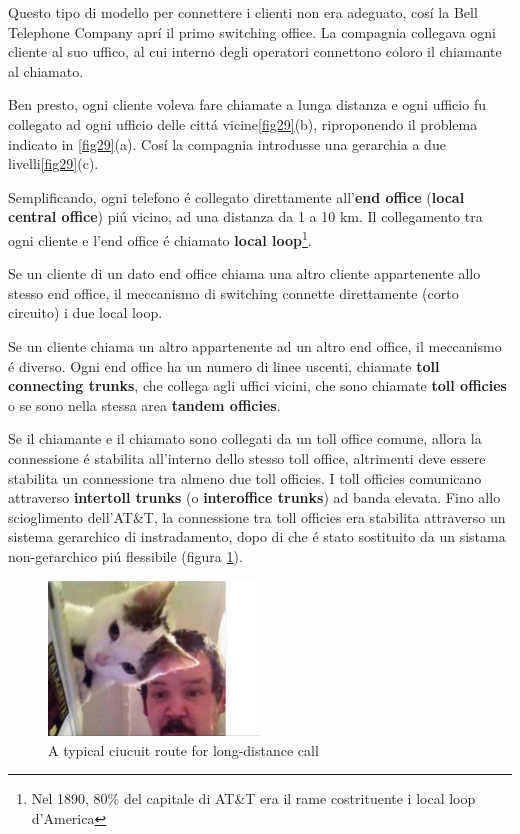 \documentclass[../ComputerNetworks.tex]{subfiles}
\begin{document}
Questo tipo di modello per connettere i clienti non era adeguato, cosí la Bell Telephone Company aprí il primo switching office.
La compagnia collegava ogni cliente al suo uffico, al cui interno degli operatori connettono coloro il chiamante al chiamato.

Ben presto, ogni cliente voleva fare chiamate a lunga distanza e ogni ufficio fu collegato ad ogni ufficio delle cittá vicine\ref{fig29}(b), riproponendo il problema indicato in \ref{fig29}(a).
Cosí la compagnia introdusse una gerarchia a due livelli\ref{fig29}(c).

Semplificando, ogni telefono é collegato direttamente all’\textbf{end office} (\textbf{local central office}) piú vicino, ad una distanza da 1 a 10 km.
Il collegamento tra ogni cliente e l’end office é chiamato \textbf{local loop}\footnote{Nel 1890, 80\% del capitale di AT\&T era il rame costrituente i local loop d’America}.

Se un cliente di un dato end office chiama una altro cliente appartenente allo stesso end office, il meccanismo di switching connette direttamente (corto circuito) i due local loop.

Se un cliente chiama un altro appartenente ad un altro end office, il meccanismo é diverso.
Ogni end office ha un numero di linee uscenti, chiamate \textbf{toll connecting trunks}, che collega agli uffici vicini, che sono chiamate \textbf{toll officies} o se sono nella stessa area \textbf{tandem officies}.

Se il chiamante e il chiamato sono collegati da un toll office comune, allora la connessione é stabilita all’interno dello stesso toll office, altrimenti deve essere stabilita un connessione tra almeno due toll officies.
I toll officies comunicano attraverso \textbf{intertoll trunks} (o \textbf{interoffice trunks}) ad banda elevata.
Fino allo scioglimento dell’AT\&T, la connessione tra toll officies era stabilita attraverso un sistema gerarchico di instradamento, dopo di che é stato sostituito da un sistama non-gerarchico piú flessibile (figura \ref{fig:nger}).

\begin{figure}[h]
    \centering
    \includegraphics[width=0.5\textwidth]{img/30.jpg}
    \caption{A typical ciucuit route for long-distance call}
    \label{fig:nger}
\end{figure}
\end{document}
